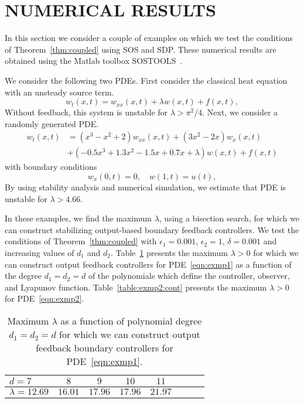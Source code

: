 \documentclass[US letter, 9 pt, conference]{ieeeconf}  \usepackage{setspace}
\begin{document}
\section{NUMERICAL RESULTS}\label{sec:num_results}
In this section we consider a couple of examples on which we test the conditions of Theorem~\ref{thm:coupled} using SOS and SDP. These numerical results are obtained using the Matlab toolbox SOSTOOLS~\cite{prajna2001introducing}.

We consider the following two PDEs. First consider the classical heat equation with an unsteady source term.
\begin{equation}\label{eqn:exmp1}
w_t(x,t)=w_{xx}(x,t)+\lambda w(x,t)+f(x,t),
\end{equation}
Without feedback, this system is unstable for $\lambda>\pi^2/4$. Next, we consider a randomly generated PDE.
\begin{align}
w_t(x,t)&= \left(x^3-x^2+2 \right)w_{xx}(x,t)+\left(3x^2-2x \right)w_x(x,t) \nonumber \\
&\label{eqn:exmp2}+ \left( -0.5x^3+1.3x^2-1.5x+0.7x+\lambda \right)w(x,t)+f(x,t)
\end{align} with boundary conditions
\begin{equation}
w_x(0,t)=0, \quad w(1,t)=u(t),
\end{equation} By using stability analysis and numerical simulation, we estimate that PDE is unstable for $\lambda>4.66$.

In these examples, we find the maximum $\lambda$, using a bisection search, for which we can construct stabilizing output-based boundary feedback controllers. We test the conditions of Theorem~\ref{thm:coupled} with $\epsilon_1=0.001$, $\epsilon_2=1$, $\delta=0.001$ and increasing values of $d_1$ and $d_2$. Table~\ref{table:exmp1:cont} presents the maximum $\lambda>0$  for which we can construct output feedback controllers for PDE~\eqref{eqn:exmp1} as a function of the degree $d_1=d_2=d$ of the polynomials which define the controller, observer, and Lyapunov function. Table~\ref{table:exmp2:cont} presents the maximum $\lambda>0$ for PDE~\eqref{eqn:exmp2}.

\begin{table}{}
\caption{Maximum $\lambda$ as a function of polynomial degree $d_1=d_2=d$ for which we can construct output feedback boundary controllers for PDE~\eqref{eqn:exmp1}.}
\vspace{-10pt}
\begin{center}
    \begin{tabular}{l *{7}{c}}\hline
  $d=7$ & $8$ & $9$ & $10$ & $11$  \\ \hline
  $\lambda=12.69$ & $16.01$ & $17.96$ & $17.96$ & $21.97$
\end{tabular}
\end{center}
\label{table:exmp1:cont}
\end{table}
\end{document}
